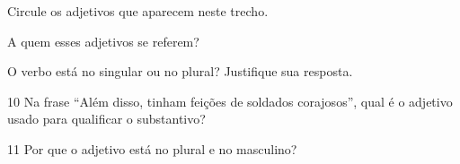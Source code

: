 \begin{conteudo}
\begin{conteudo}
\begin{conteudo}
\begin{conteudo}
\begin{conteudo}
\begin{escolha}
\item  Circule os adjetivos que aparecem neste trecho.


\item  A quem esses adjetivos se referem?

\item O verbo está no singular ou no plural? Justifique sua resposta.

\end{escolha}

\num{10} Na frase ``Além disso, tinham feições de soldados corajosos'', qual é o
adjetivo usado para qualificar o substantivo?


\num{11} Por que o adjetivo está no plural e no masculino?

\end{conteudo}
\end{conteudo}
\end{conteudo}
\end{conteudo}
\end{conteudo}
